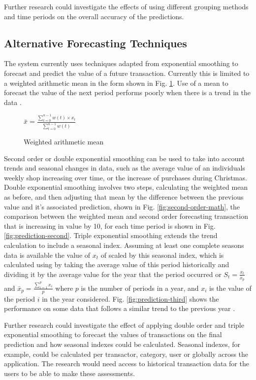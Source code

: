 Further research could investigate the effects of using different grouping methods and time periods on the overall accuracy of the predictions.

\subsection{Alternative Forecasting Techniques}
\label{section:triplesmoothing}
The system currently uses techniques adapted from exponential smoothing to forecast and predict the value of a future transaction. Currently this is limited to a weighted arithmetic mean in the form shown in Fig. \ref{fig:weighted-mean}. Use of a mean to forecast the value of the next period performs poorly when there is a trend in the data \parencite{filliben2003nist}.

\begin{figure}
\centering
$\bar{x} = \frac{\sum^{n-1}_{t=0}{w(t) \times x_{t}}}{\sum_{t=0}^{n-1}{w(t)}}$
\caption{Weighted arithmetic mean}
\label{fig:weighted-mean}
\end{figure}

Second order or double exponential smoothing can be used to take into account trends and seasonal changes in data, such as the average value of an individuals weekly shop increasing over time, or the increase of purchases during Christmas. 
%
Double exponential smoothing involves two steps, calculating the weighted mean as before, and then adjusting that mean by the difference between the previous value and it's associated prediction, shown in Fig. \ref{fig:second-order-math}, the comparison between the weighted mean and second order forecasting transaction that is increasing in value by 10, for each time period is shown in Fig. \ref{fig:prediction-second}. 
%
Triple exponential smoothing extends the trend calculation to include a seasonal index. Assuming at least one complete seasons data is available the value of $x_t$ of scaled by this seasonal index, which is calculated using by taking the average value of this period historically and dividing it by the average value for the year that the period occurred or $S_{t} = \frac{x_t}{\bar{x}_p}$ and $\bar{x}_p = \frac{\sum_{i=1}^{p} x_i}{p}$ where $p$ is the number of periods in a year, and $x_i$ is the value of the period $i$ in the year considered. Fig. \ref{fig:prediction-third} shows the performance on some data that follows a similar trend to the previous year \parencite{kalekar2004holtwinters,dash2012movingaverages}.

Further research could investigate the effect of applying double order and triple exponential smoothing to forecast the values of transactions on the final prediction and how seasonal indexes could be calculated. Seasonal indexes, for example, could be calculated per transactor, category, user or globally across the application. The research would need access to historical transaction data for the users to be able to make these assessments.

